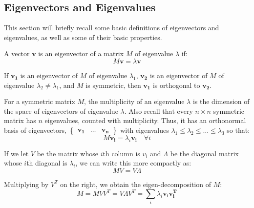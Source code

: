 \subsection{Eigenvectors and Eigenvalues}
\label{eigenvectors}
\label{eigenvalues}
This section will briefly recall some basic definitions of eigenvectors and
eigenvalues, as well as some of their basic properties.

A vector $\mathbf{v}$ is an eigenvector of a matrix $M$ of eigenvalue $\lambda$
if:
\begin{equation}
M\mathbf{v} = \lambda\textbf{v}
\end{equation}

If $\mathbf{v_1}$ is an eigenvector of $M$ of eigenvalue $\lambda_1$,
$\mathbf{v_2}$ is an eigenvector of $M$ of eigenvalue $\lambda_2\neq\lambda_1$,
and $M$ is symmetric, then $\mathbf{v_1}$ is orthogonal to $\mathbf{v_2}$.

For a symmetric matrix $M$, the multiplicity of an eigenvalue $\lambda$ is the
dimension of the space of eigenvectors of eigenvalue $\lambda$. Also recall that
every $n\times n$ symmetric matrix has $n$ eigenvalues, counted with
multiplicity. Thus, it has an orthonormal basis of eigenvectors,
$\begin{Bmatrix} \mathbf{v_1} & \ldots & \mathbf{v_n} \end{Bmatrix}$ with
eigenvalues $\lambda_1\leq\lambda_2\leq\ldots\leq\lambda_3$ so that:
\begin{equation}
M\mathbf{v_i} = \lambda_i \mathbf{v_i} \quad \forall i
\end{equation}

If we let $V$ be the matrix whose $i$th column is $v_i$ and $\Lambda$ be the
diagonal matrix whose $i$th diagonal is $\lambda_i$, we can write this more
compactly as:
\begin{equation}
MV = V\Lambda
\end{equation}

Multiplying by $V^T$ on the right, we obtain the eigen-decomposition of $M$:
\begin{equation}
M = MVV^T = V{\Lambda}V^T = \sum_i \lambda_i\mathbf{v_i}\mathbf{v_i^T}
\end{equation}

